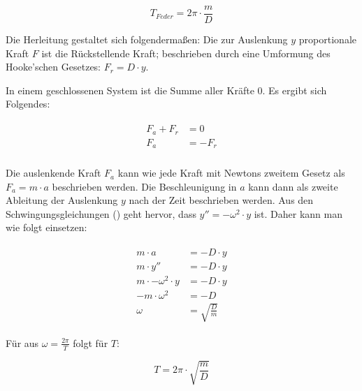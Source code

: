 \begin{equation}
	T_{Feder}=2\pi \cdot \frac{m}{D}
\end{equation}

Die Herleitung gestaltet sich folgendermaßen: Die zur Auslenkung $y$ proportionale Kraft $F$ ist die Rückstellende Kraft; beschrieben durch eine Umformung des Hooke'schen Gesetzes: $F_{r}=D \cdot y$. 

In einem geschlossenen System ist die Summe aller Kräfte $0$. Es ergibt sich Folgendes:

\begin{align}
\begin{split}
	F_a + F_r &= 0 \\
	F_a &= -F_r \\
\end{split}
\end{align}

Die auslenkende Kraft $F_a$ kann wie jede Kraft mit Newtons zweitem Gesetz als $F_a=m \cdot a$ beschrieben werden. Die Beschleunigung in $a$ kann dann als zweite Ableitung der Auslenkung $y$ nach der Zeit beschrieben werden. Aus den Schwingungsgleichungen () geht hervor, dass $y''=-\omega^{2} \cdot y$ ist. Daher kann man wie folgt einsetzen:

\begin{align}
\begin{split}
	m \cdot a &= -D \cdot y \\
	m \cdot y'' &= -D \cdot y \\
	m \cdot -\omega^{2} \cdot y &= -D \cdot y \\
	- m \cdot \omega^{2} &= -D \\
	\omega &= \sqrt{\frac{D}{m}}
\end{split}
\end{align}

Für aus $\omega=\frac{2\pi}{T}$ folgt für $T$:

\begin{equation}
	T = 2\pi \cdot \sqrt{\frac{m}{D}}
\end{equation}
